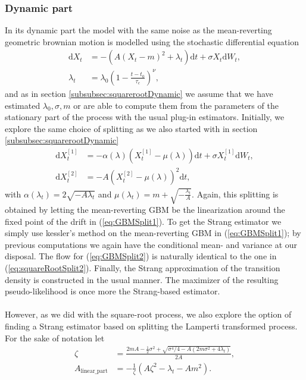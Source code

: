 \subsubsection{Dynamic part}\label{subsubsec:meanrevertingGBMDynamic}
In its dynamic part the model with the same noise as the mean-reverting geometric brownian motion is modelled using the stochastic differential equation
\begin{align}
    \mathrm{d}X_t &= -\left(A\left(X_t - m\right)^2 + \lambda_t\right)\mathrm{d}t + \sigma X_t \mathrm{d}W_t, \label{eq:GBM_dynamic_SDE}\\
    \lambda_t &= \lambda_0\left(1 - \frac{t - t_0}{\tau_c}\right)^\nu,
\end{align}
and as in section \ref{subsubsec:squarerootDynamic} we assume that we have estimated $\lambda_0, \sigma, m$ or are able to compute them from the parameters of the stationary part of the process with the usual plug-in estimators. Initially, we explore the same choice of splitting as we also started with in section \ref{subsubsec:squarerootDynamic}
\begin{align}
    \mathrm{d}X_t^{[1]} &= -\alpha(\lambda)\left(X_t^{[1]} - \mu(\lambda)\right)  \mathrm{d}t + \sigma X_t^{[1]} \mathrm{d}W_t, \label{eq:GBMSplit1} \\
    \mathrm{d}X_t^{[2]} &= - A \left(X_t^{[2]} - \mu(\lambda)\right)^2 \mathrm{d}t, \label{eq:GBMSplit2}
\end{align}
with $\alpha(\lambda_t) = 2\sqrt{-A\lambda_t}$ and $\mu(\lambda_t) = m + \sqrt{-\frac{\lambda_t}{A}}$.
Again, this splitting is obtained by letting the mean-reverting GBM be the linearization around the fixed point of the drift in (\ref{eq:GBMSplit1}). To get the Strang estimator we simply use kessler's method on the mean-reverting GBM in (\ref{eq:GBMSplit1}); by previous computations we again have the conditional mean- and variance at our disposal. The flow for (\ref{eq:GBMSplit2}) is naturally identical to the one in (\ref{eq:squareRootSplit2}). Finally, the Strang approximation of the transition density is constructed in the usual manner. The maximizer of the resulting pseudo-likelihood is once more the Strang-based estimator.\\\\
However, as we did with the square-root process, we also explore the option of finding a Strang estimator based on splitting the Lamperti transformed process. For the sake of notation let
\begin{align}
    \zeta &= \frac{2mA - \frac{1}{2}\sigma^2 + \sqrt{\sigma^4/4 - A\left(2m\sigma^2 + 4\lambda_t\right)}}{2A},\\
    A_{\mathrm{linear\_part}} &= - \frac{1}{\zeta}\left(A \zeta^2 - \lambda_t - Am^2\right).
\end{align}
